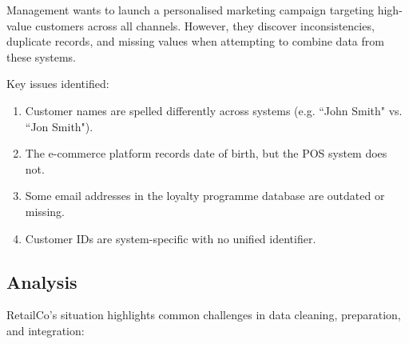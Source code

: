 Management wants to launch a personalised marketing campaign targeting high-value customers across all channels. However, they discover inconsistencies, duplicate records, and missing values when attempting to combine data from these systems.

Key issues identified:

\begin{enumerate}
	\item Customer names are spelled differently across systems (e.g. ``John Smith" vs. ``Jon Smith").
	\item The e-commerce platform records date of birth, but the POS system does not.
	\item Some email addresses in the loyalty programme database are outdated or missing.
	\item Customer IDs are system-specific with no unified identifier.
\end{enumerate}

\subsection{Analysis}

RetailCo's situation highlights common challenges in data cleaning, preparation, and integration:

